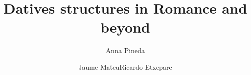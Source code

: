 \title{Datives structures in Romance and beyond}
\author{Anna Pineda\and  Jaume Mateu\lastand Ricardo Etxepare}
\subtitle{}
\renewcommand{\lsISBNdigital}{000-0-000000-00-0}
\renewcommand{\lsISBNhardcover}{000-0-000000-00-0}
\renewcommand{\lsISBNsoftcover}{000-0-000000-00-0}
\renewcommand{\lsSeries}{ogs} %
\renewcommand{\lsSeriesNumber}{} %

  